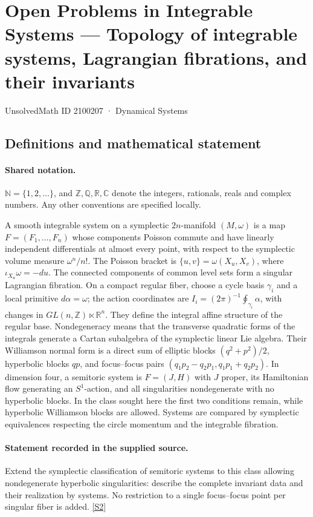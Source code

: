 \documentclass[11pt]{article}
\newcommand{\sref}[2]{\hyperlink{source:#1:#2}{[S#2]}}
\begin{document}
\setcounter{section}{2100206}
\section{Open Problems in Integrable Systems — Topology of integrable systems, Lagrangian fibrations, and their invariants}\label{2100207}
{\small\sffamily UnsolvedMath ID 2100207 · Dynamical Systems}
\subsection{Definitions and mathematical statement}

\paragraph{Shared notation.}$\mathbb N=\{1,2,\ldots\}$, and $\mathbb Z,\mathbb Q,\mathbb R,\mathbb C$ denote the integers, rationals, reals and complex numbers. Any other conventions are specified locally.


A smooth integrable system on a symplectic $2n$-manifold $(M,\omega)$ is a map $F=(F_1,\ldots,F_n)$ whose components Poisson commute and have linearly independent differentials at almost every point, with respect to the symplectic volume measure $\omega^n/n!$. The Poisson bracket is $\{u,v\}=\omega(X_u,X_v)$, where $\iota_{X_u}\omega=-du$. The connected components of common level sets form a singular Lagrangian fibration. On a compact regular fiber, choose a cycle basis $\gamma_i$ and a local primitive $d\alpha=\omega$; the action coordinates are $I_i=(2\pi)^{-1}\oint_{\gamma_i}\alpha$, with changes in $GL(n,\mathbb Z)\ltimes\mathbb R^n$. They define the integral affine structure of the regular base. Nondegeneracy means that the transverse quadratic forms of the integrals generate a Cartan subalgebra of the symplectic linear Lie algebra. Their Williamson normal form is a direct sum of elliptic blocks $(q^2+p^2)/2$, hyperbolic blocks $qp$, and focus--focus pairs $(q_1p_2-q_2p_1,q_1p_1+q_2p_2)$. In dimension four, a semitoric system is $F=(J,H)$ with $J$ proper, its Hamiltonian flow generating an $S^1$-action, and all singularities nondegenerate with no hyperbolic blocks. In the class sought here the first two conditions remain, while hyperbolic Williamson blocks are allowed. Systems are compared by symplectic equivalences respecting the circle momentum and the integrable fibration.
\paragraph{Statement recorded in the supplied source.}
Extend the symplectic classification of semitoric systems to this class allowing nondegenerate hyperbolic singularities: describe the complete invariant data and their realization by systems. No restriction to a single focus--focus point per singular fiber is added. \sref{2100207}{2}
\end{document}
